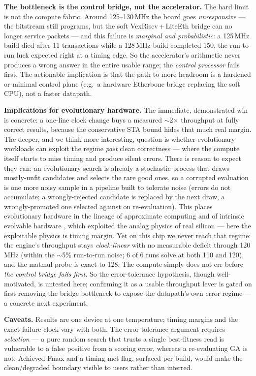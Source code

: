 \textbf{The bottleneck is the control bridge, not the accelerator.} The hard
limit is not the compute fabric. Around \mbox{125--130\,MHz} the board goes
\emph{unresponsive} --- the bitstream still programs, but the soft
VexRiscv\,+\,LiteEth bridge can no longer service packets --- and this failure is
\emph{marginal and probabilistic}: a 125\,MHz build died after 11 transactions
while a 128\,MHz build completed 150, the run-to-run luck expected right at a
timing edge. So the accelerator's arithmetic never produces a wrong answer in the
entire usable range; the \emph{control processor} fails first. The actionable
implication is that the path to more headroom is a hardened or minimal control
plane (e.g.\ a hardware Etherbone bridge replacing the soft CPU), not a faster
datapath.

\textbf{Implications for evolutionary hardware.} The immediate, demonstrated win
is concrete: a one-line clock change buys a measured \mbox{$\sim$2$\times$}
throughput at fully correct results, because the conservative STA bound hides
that much real margin. The deeper, and we think more interesting, question is
whether evolutionary workloads can exploit the regime \emph{past} clean
correctness --- where the compute itself starts to miss timing and produce silent
errors. There is reason to expect they can: an evolutionary search is already a
stochastic process that draws mostly-unfit candidates and selects the rare good
ones, so a corrupted evaluation is one more noisy sample in a pipeline built to
tolerate noise (errors do not accumulate; a wrongly-rejected candidate is
replaced by the next draw, a wrongly-promoted one selected against on
re-evaluation). This places evolutionary hardware in the lineage of approximate
computing and of intrinsic evolvable hardware \citep{thompson1996evolved}, which
exploited the analog physics of real silicon --- here the exploitable physics is
timing margin. Yet on this chip we never reach that regime: the engine's
throughput stays \emph{clock-linear} with no measurable deficit through
120\,MHz (within the $\sim$5\% run-to-run noise; 6 of 6 runs solve at both 110
and 120), and the matmul probe is exact to 128. The compute simply does not err
before \emph{the control bridge fails first}. So the error-tolerance hypothesis,
though well-motivated, is untested here; confirming it as a usable throughput
lever is gated on first removing the bridge bottleneck to expose the datapath's
own error regime --- a concrete next experiment.

\textbf{Caveats.} Results are one device at one temperature; timing margins and
the exact failure clock vary with both. The error-tolerance argument requires
\emph{selection} --- a pure random search that trusts a single best-fitness read
is vulnerable to a false positive from a scoring error, whereas a re-evaluating
GA is not. Achieved-Fmax and a timing-met flag, surfaced per build, would make
the clean/degraded boundary visible to users rather than inferred.
